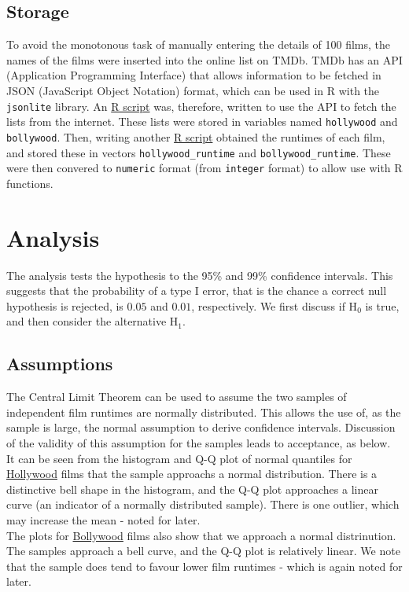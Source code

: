 \documentclass{article}
\begin{document}
\subsection{Storage}
To avoid the monotonous task of manually entering the details of 100 films, the names of the films were inserted into the online list on TMDb. TMDb has an API (Application Programming Interface) that allows information to be fetched in JSON (JavaScript Object Notation) format, which can be used in R with the \texttt{jsonlite} library. An \hyperref[sec:films]{R script} was, therefore, written to use the API to fetch the lists from the internet. These lists were stored in variables named \texttt{hollywood} and \texttt{bollywood}. Then, writing another \hyperref[sec:runtime]{R script} obtained the runtimes of each film, and stored these in vectors \texttt{hollywood\_runtime} and \texttt{bollywood\_runtime}. These were then convered to \texttt{numeric} format (from \texttt{integer} format) to allow use with R functions.
\section{Analysis}
The analysis tests the hypothesis to the 95\% and 99\% confidence intervals. This suggests that the probability of a type I error, that is the chance a correct null hypothesis is rejected, is $0.05$ and $0.01$, respectively. We first discuss if H$_\text{0}$ is true, and then consider the alternative H$_\text{1}$.
\subsection{Assumptions}
The Central Limit Theorem can be used to assume the two samples of independent film runtimes are normally distributed. This allows the use of, as the sample is large, the normal assumption to derive confidence intervals. Discussion of the validity of this assumption for the samples leads to acceptance, as below.\\
It can be seen from the histogram and Q-Q plot of normal quantiles for \hyperref[sec:hollywood]{Hollywood} films that the sample approachs a normal distribution. There is a distinctive bell shape in the histogram, and the Q-Q plot approaches a linear curve (an indicator of a normally distributed sample). There is one outlier, which may increase the mean - noted for later.\\
The plots for \hyperref[sec:bollywood]{Bollywood} films also show that we approach a normal distrinution. The samples approach a bell curve, and the Q-Q plot is relatively linear. We note that the sample does tend to favour lower film runtimes - which is again noted for later.
\end{document}
